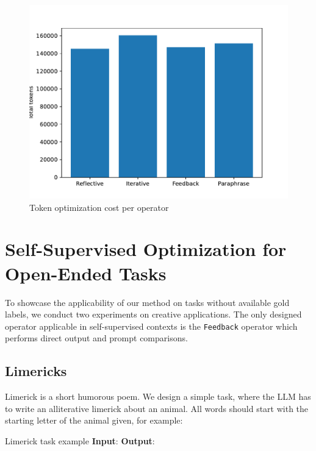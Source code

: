 \begin{figure}
    \label{fig:usage}
    \includegraphics[width=\linewidth]{usage.pdf}
    \caption{Token optimization cost per operator}
\end{figure}

\newpage

\section{Self-Supervised Optimization for Open-Ended Tasks}
To showcase the applicability of our method on tasks without available gold labels, we conduct two experiments
on creative applications. The only designed operator applicable in self-supervised contexts is the \texttt{Feedback} 
operator which performs direct output and prompt comparisons.

\subsection{Limericks}
Limerick is a short humorous poem. We design a simple task, where the LLM has to write an alliterative limerick about an animal. 
All words should start with the starting letter of the animal given, for example:

\begin{promptbox}[label={box:limerick}]{Limerick task example}
    \textbf{Input}:
    \textbf{Output}:
\end{promptbox}

